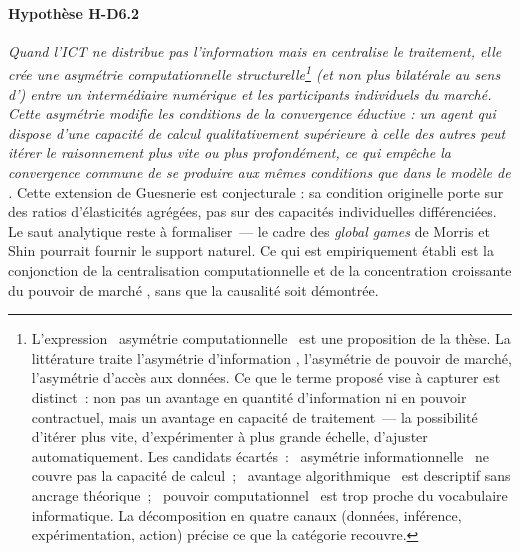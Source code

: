 \paragraph{Hypothèse H-D6.2} \emph{Quand l'ICT ne distribue pas l'information mais en centralise le traitement, elle crée une asymétrie computationnelle \emph{structurelle}\footnote{L'expression \og~asymétrie computationnelle~\fg{} est une proposition de la thèse. La littérature traite l'asymétrie d'information \parencite{stiglitz_contributions_2000}, l'asymétrie de pouvoir de marché, l'asymétrie d'accès aux données. Ce que le terme proposé vise à capturer est distinct~: non pas un avantage en quantité d'information ni en pouvoir contractuel, mais un avantage en capacité de traitement~--- la possibilité d'itérer plus vite, d'expérimenter à plus grande échelle, d'ajuster automatiquement. Les candidats écartés~: \og~asymétrie informationnelle~\fg{} ne couvre pas la capacité de calcul~; \og~avantage algorithmique~\fg{} est descriptif sans ancrage théorique~; \og~pouvoir computationnel~\fg{} est trop proche du vocabulaire informatique. La décomposition en quatre canaux (données, inférence, expérimentation, action) précise ce que la catégorie recouvre.} (et non plus bilatérale au sens d'\textcite{akerlof_lemons_1970}) entre un intermédiaire numérique et les participants individuels du marché. Cette asymétrie modifie les conditions de la convergence éductive : un agent qui dispose d'une capacité de calcul qualitativement supérieure à celle des autres peut itérer le raisonnement plus vite ou plus profondément, ce qui empêche la convergence commune de se produire aux mêmes conditions que dans le modèle de \textcite{guesnerie_assessing_1992}.} Cette extension de Guesnerie est conjecturale : sa condition originelle porte sur des ratios d'élasticités agrégées, pas sur des capacités individuelles différenciées. Le saut analytique reste à formaliser~--- le cadre des \emph{global games} de Morris et Shin pourrait fournir le support naturel. Ce qui est empiriquement établi est la conjonction de la centralisation computationnelle et de la concentration croissante du pouvoir de marché \parencite{deloecker_rise_2020,autor_fall_2020,de_ridder_2024}, sans que la causalité soit démontrée.

\medskip

